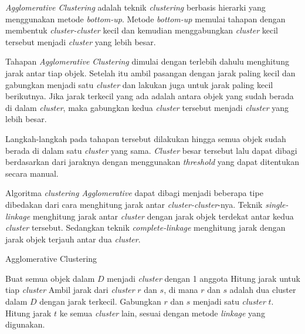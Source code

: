 \textit{Agglomerative Clustering} adalah teknik \textit{clustering} berbasis hierarki yang menggunakan metode \textit{bottom-up}. Metode \textit{bottom-up} memulai tahapan dengan membentuk \textit{cluster-cluster} kecil dan kemudian menggabungkan \textit{cluster} kecil tersebut menjadi \textit{cluster} yang lebih besar.

Tahapan \textit{Agglomerative Clustering} dimulai dengan terlebih dahulu menghitung jarak antar tiap objek. Setelah itu ambil pasangan dengan jarak paling kecil dan gabungkan menjadi satu \textit{cluster} dan lakukan juga untuk jarak paling kecil berikutnya. Jika jarak terkecil yang ada adalah antara objek yang sudah berada di dalam \textit{cluster}, maka gabungkan kedua \textit{cluster} tersebut menjadi \textit{cluster} yang lebih besar. 

Langkah-langkah pada tahapan tersebut dilakukan hingga semua objek sudah berada di dalam satu \textit{cluster} yang sama. \textit{Cluster} besar tersebut lalu dapat dibagi berdasarkan dari jaraknya dengan menggunakan \textit{threshold} yang dapat ditentukan secara manual.

Algoritma \textit{clustering Agglomerative} dapat dibagi menjadi beberapa tipe dibedakan dari cara menghitung jarak antar \textit{cluster-cluster}-nya. Teknik \textit{single-linkage} menghitung jarak antar \textit{cluster} dengan jarak objek terdekat antar kedua \textit{cluster} tersebut. Sedangkan teknik \textit{complete-linkage} menghitung jarak dengan jarak objek terjauh antar dua \textit{cluster}.

\begin{algorithm}[H]
	\caption{Agglomerative Clustering}
	\label{alg:agglomerative}
	\begin{algorithmic}[1]
		\STATE Buat semua objek dalam $D$ menjadi \textit{cluster} dengan 1 anggota
		\STATE Hitung jarak untuk tiap \textit{cluster}
		\STATE Ambil jarak dari \textit{cluster} $r$ dan $s$, di mana $r$ dan $s$ adalah dua cluster dalam $D$ dengan jarak terkecil.
		\STATE Gabungkan $r$ dan $s$ menjadi satu \textit{cluster} $t$. 
		\STATE Hitung jarak $t$ ke semua \textit{cluster} lain, sesuai dengan metode \textit{linkage} yang digunakan.
		\ENDWHILE
	\end{algorithmic}
\end{algorithm}

